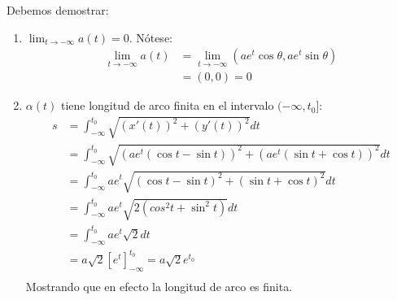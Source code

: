\begin{problema}
\begin{enumerate}
\begin{sol}
        Debemos demostrar: 
        \begin{enumerate}
            \item $\lim_{t\to -\infty} a(t)=0$. Nótese: 
            \begin{align*}
                \lim_{t\to -\infty} a(t) &= \lim_{t\to -\infty} (ae^{t}\cos \theta,ae^{t}\sin \theta)\\
                &= (0,0)=0
            \end{align*}
            \item $\alpha(t)$ tiene longitud de arco finita en el intervalo $(-\infty, t_0]$: 
            \begin{align*}
                s &= \int_{-\infty}^{t_0} \sqrt{\left(x'(t)\right)^2+\left(y'(t)\right)^2}dt\\
                &= \int_{-\infty}^{t_0} \sqrt{\left(ae^{t}\left(\cos t -\sin t \right)\right)^2+\left(ae^{t}\left(\sin t+ \cos t \right)\right)^2}dt\\
                &= \int_{-\infty}^{t_0} ae^{t}\sqrt{\left(\cos t -\sin t \right)^2+\left(\sin t+ \cos t \right)^2}dt\\
                &= \int_{-\infty}^{t_0} ae^{t}\sqrt{2\left(cos^2t +\sin^2t\right)}dt\\
                &= \int_{-\infty}^{t_0} ae^{t}\sqrt{2}dt\\
                & = a\sqrt{2} \left[e^t\right]_{-\infty}^{t_0} = a\sqrt{2} e^{t_0}\\
            \end{align*}
            Mostrando que en efecto la longitud de arco es finita.
        \end{enumerate}
        

\end{sol}
\end{enumerate}
\end{problema}
